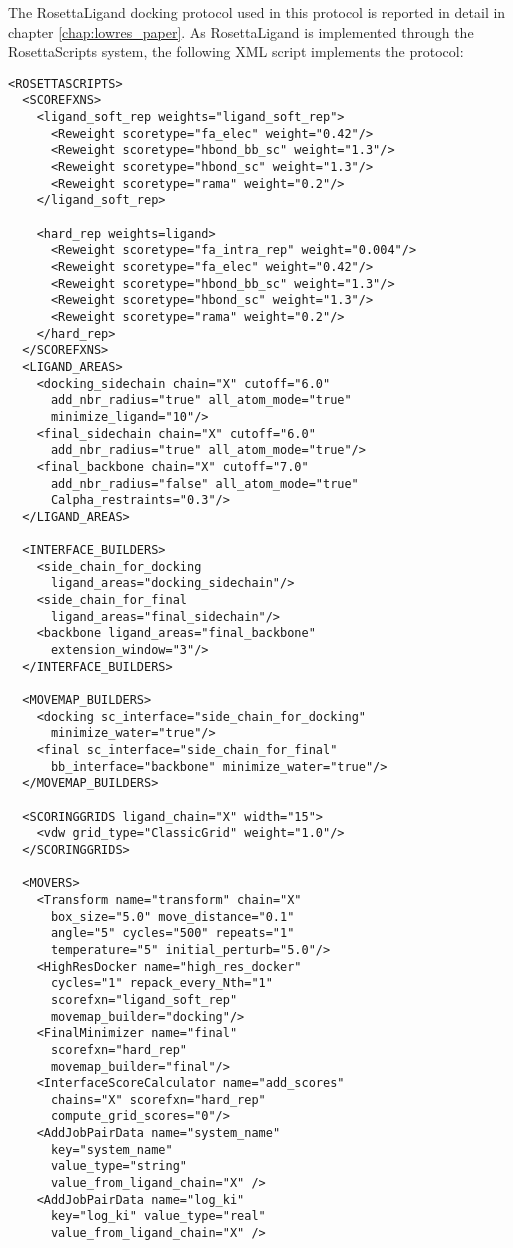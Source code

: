 The RosettaLigand docking protocol used in this protocol is reported in detail in chapter \ref{chap:lowres_paper}.
As RosettaLigand is implemented through the RosettaScripts system, the following \ac{XML} script implements the protocol:
\singlespace
\begin{verbatim}
<ROSETTASCRIPTS>
  <SCOREFXNS>
    <ligand_soft_rep weights="ligand_soft_rep">
      <Reweight scoretype="fa_elec" weight="0.42"/>
      <Reweight scoretype="hbond_bb_sc" weight="1.3"/>
      <Reweight scoretype="hbond_sc" weight="1.3"/>
      <Reweight scoretype="rama" weight="0.2"/>
    </ligand_soft_rep>
  
    <hard_rep weights=ligand>
      <Reweight scoretype="fa_intra_rep" weight="0.004"/>
      <Reweight scoretype="fa_elec" weight="0.42"/>
      <Reweight scoretype="hbond_bb_sc" weight="1.3"/>
      <Reweight scoretype="hbond_sc" weight="1.3"/>
      <Reweight scoretype="rama" weight="0.2"/>
    </hard_rep>
  </SCOREFXNS>
  <LIGAND_AREAS>
    <docking_sidechain chain="X" cutoff="6.0"
      add_nbr_radius="true" all_atom_mode="true"
      minimize_ligand="10"/>
    <final_sidechain chain="X" cutoff="6.0" 
      add_nbr_radius="true" all_atom_mode="true"/>
    <final_backbone chain="X" cutoff="7.0" 
      add_nbr_radius="false" all_atom_mode="true"
      Calpha_restraints="0.3"/>
  </LIGAND_AREAS>
  
  <INTERFACE_BUILDERS>
    <side_chain_for_docking
      ligand_areas="docking_sidechain"/>
    <side_chain_for_final
      ligand_areas="final_sidechain"/>
    <backbone ligand_areas="final_backbone"
      extension_window="3"/>
  </INTERFACE_BUILDERS>
  
  <MOVEMAP_BUILDERS>
    <docking sc_interface="side_chain_for_docking"
      minimize_water="true"/>
    <final sc_interface="side_chain_for_final"
      bb_interface="backbone" minimize_water="true"/>
  </MOVEMAP_BUILDERS>
  
  <SCORINGGRIDS ligand_chain="X" width="15">
    <vdw grid_type="ClassicGrid" weight="1.0"/>
  </SCORINGGRIDS>
  
  <MOVERS>
    <Transform name="transform" chain="X"
      box_size="5.0" move_distance="0.1"
      angle="5" cycles="500" repeats="1"
      temperature="5" initial_perturb="5.0"/>
    <HighResDocker name="high_res_docker"
      cycles="1" repack_every_Nth="1"
      scorefxn="ligand_soft_rep"
      movemap_builder="docking"/>
    <FinalMinimizer name="final"
      scorefxn="hard_rep" 
      movemap_builder="final"/>
    <InterfaceScoreCalculator name="add_scores"
      chains="X" scorefxn="hard_rep" 
      compute_grid_scores="0"/>
    <AddJobPairData name="system_name"
      key="system_name"
      value_type="string"
      value_from_ligand_chain="X" />
    <AddJobPairData name="log_ki"
      key="log_ki" value_type="real"
      value_from_ligand_chain="X" />
    

\end{verbatim}
